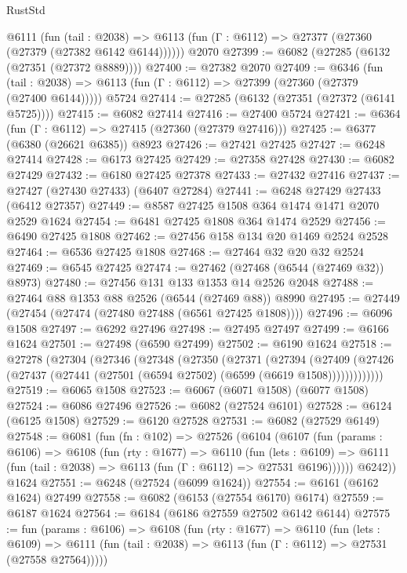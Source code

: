 \begin{lexlean}{RustStd}
\begin{coremodule}
    @6111
      (fun (tail : @2038) =>
      @6113 (fun (Γ : @6112) => @27377 (@27360 (@27379 (@27382 @6142 @6144))))))
    @2070
@27399 := @6082 (@27285 (@6132 (@27351 (@27372 @8889))))
@27400 := @27382 @2070
@27409 := @6346
    (fun (tail : @2038) => @6113 (fun (Γ : @6112) => @27399 (@27360 (@27379 (@27400 @6144)))))
    @5724
@27414 := @27285 (@6132 (@27351 (@27372 (@6141 @5725))))
@27415 := @6082 @27414
@27416 := @27400 @5724
@27421 := @6364 (fun (Γ : @6112) => @27415 (@27360 (@27379 @27416)))
@27425 := @6377 (@6380 (@26621 @6385)) @8923
@27426 := @27421 @27425
@27427 := @6248 @27414
@27428 := @6173 @27425
@27429 := @27358 @27428
@27430 := @6082 @27429
@27432 := @6180 @27425 @27378
@27433 := @27432 @27416
@27437 := @27427 (@27430 @27433) (@6407 @27284)
@27441 := @6248 @27429 @27433 (@6412 @27357)
@27449 := @8587 @27425 @1508 @364 @1474 @1471 @2070 @2529 @1624
@27454 := @6481 @27425 @1808 @364 @1474 @2529
@27456 := @6490 @27425 @1808
@27462 := @27456 @158 @134 @20 @1469 @2524 @2528
@27464 := @6536 @27425 @1808
@27468 := @27464 @32 @20 @32 @2524
@27469 := @6545 @27425
@27474 := @27462 (@27468 (@6544 (@27469 @32)) @8973)
@27480 := @27456 @131 @133 @1353 @14 @2526 @2048
@27488 := @27464 @88 @1353 @88 @2526 (@6544 (@27469 @88)) @8990
@27495 := @27449 (@27454 (@27474 (@27480 @27488 (@6561 @27425 @1808))))
@27496 := @6096 @1508
@27497 := @6292 @27496
@27498 := @27495 @27497
@27499 := @6166 @1624
@27501 := @27498 (@6590 @27499)
@27502 := @6190 @1624
@27518 := @27278
    (@27304
      (@27346
        (@27348
          (@27350
            (@27371
              (@27394
                (@27409
                  (@27426 (@27437 (@27441 (@27501 (@6594 @27502) (@6599 (@6619 @1508)))))))))))))
@27519 := @6065 @1508
@27523 := @6067 (@6071 @1508) (@6077 @1508)
@27524 := @6086 @27496
@27526 := @6082 (@27524 @6101)
@27528 := @6124 (@6125 @1508)
@27529 := @6120 @27528
@27531 := @6082 (@27529 @6149)
@27548 := @6081
    (fun (fn : @102) =>
    @27526
      (@6104
        (@6107
          (fun (params : @6106) =>
          @6108
            (fun (rty : @1677) =>
            @6110
              (fun (lets : @6109) =>
              @6111 (fun (tail : @2038) => @6113 (fun (Γ : @6112) => @27531 @6196))))))
        @6242))
    @1624
@27551 := @6248 (@27524 (@6099 @1624))
@27554 := @6161 (@6162 @1624) @27499
@27558 := @6082 (@6153 (@27554 @6170) @6174)
@27559 := @6187 @1624
@27564 := @6184 (@6186 @27559 @27502 @6142 @6144)
@27575 := fun (params : @6106) =>
  @6108
    (fun (rty : @1677) =>
    @6110
      (fun (lets : @6109) =>
      @6111 (fun (tail : @2038) => @6113 (fun (Γ : @6112) => @27531 (@27558 @27564)))))

\end{coremodule}
\end{lexlean}
